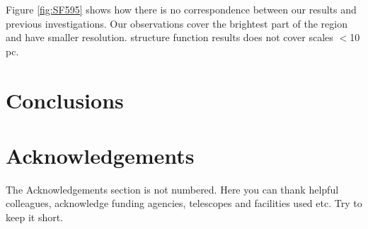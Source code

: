 \documentclass[fleqn,usenatbib]{mnras}
\begin{document}
Figure \ref{fig:SF595} shows how there is no correspondence between our results and previous investigations. Our observations cover the brightest part of the region and have smaller resolution. \citet{lagrois2011} structure function results does not cover scales $<$10 pc.




\section{Conclusions}\label{sec:concl}


\section*{Acknowledgements}

The Acknowledgements section is not numbered. Here you can thank helpful
colleagues, acknowledge funding agencies, telescopes and facilities used etc.
Try to keep it short.






\bsp	%
\label{lastpage}
\end{document}
